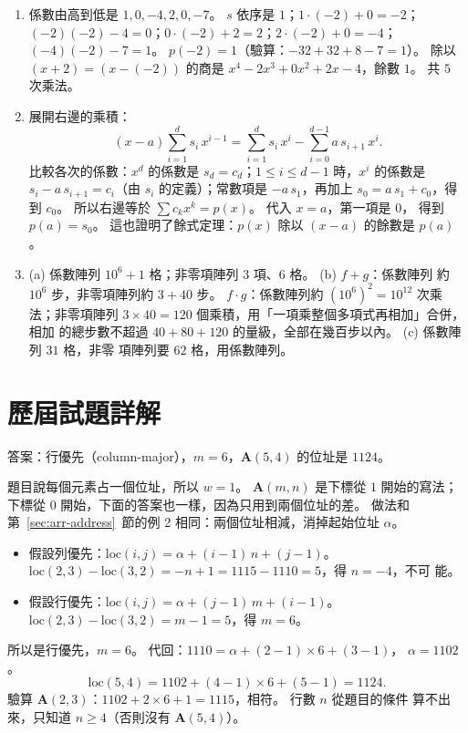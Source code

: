 \begin{enumerate}
\item 係數由高到低是 $1, 0, -4, 2, 0, -7$。 $s$ 依序是 $1$；$1 \cdot (-2) + 0 = -2$；
$(-2)(-2) - 4 = 0$；$0 \cdot (-2) + 2 = 2$；$2 \cdot (-2) + 0 = -4$；$(-4)(-2) - 7 = 1$。
$p(-2) = 1$（驗算：$-32 + 32 + 8 - 7 = 1$）。 除以 $(x + 2) = (x - (-2))$ 的商是
$x^4 - 2x^3 + 0x^2 + 2x - 4$，餘數 $1$。 共 $5$ 次乘法。

\item 展開右邊的乘積：
\[
(x - a)\sum_{i=1}^{d} s_i\,x^{i-1} = \sum_{i=1}^{d} s_i\,x^{i} - \sum_{i=0}^{d-1} a\,s_{i+1}\,x^{i} .
\]
比較各次的係數：$x^d$ 的係數是 $s_d = c_d$；$1 \le i \le d - 1$ 時，$x^i$ 的係數是
$s_i - a\,s_{i+1} = c_i$（由 $s_i$ 的定義）；常數項是 $-a\,s_1$，再加上 $s_0 = a\,s_1
+ c_0$，得到 $c_0$。 所以右邊等於 $\sum c_k x^k = p(x)$。 代入 $x = a$，第一項是 $0$，
得到 $p(a) = s_0$。 這也證明了餘式定理：$p(x)$ 除以 $(x - a)$ 的餘數是 $p(a)$。

\item (a) 係數陣列 $10^6 + 1$ 格；非零項陣列 $3$ 項、$6$ 格。 (b) $f + g$：係數陣列
約 $10^6$ 步，非零項陣列約 $3 + 40$ 步。 $f \cdot g$：係數陣列約 $(10^6)^2 = 10^{12}$
次乘法；非零項陣列 $3 \times 40 = 120$ 個乘積，用「一項乘整個多項式再相加」合併，相加
的總步數不超過 $40 + 80 + 120$ 的量級，全部在幾百步以內。 (c) 係數陣列 $31$ 格，非零
項陣列要 $62$ 格，用係數陣列。
\end{enumerate}

\section*{歷屆試題詳解}

答案：行優先（column-major），$m = 6$，$\mathbf{A}(5,4)$ 的位址是 $1124$。

題目說每個元素占一個位址，所以 $w = 1$。 $\mathbf{A}(m, n)$ 是下標從 $1$ 開始的寫法；
下標從 $0$ 開始，下面的答案也一樣，因為只用到兩個位址的差。 做法和
第~\ref{sec:arr-address}~節的例 2 相同：兩個位址相減，消掉起始位址 $\alpha$。

\begin{itemize}
\item 假設列優先：$\mathrm{loc}(i, j) = \alpha + (i - 1)\,n + (j - 1)$。
$\mathrm{loc}(2,3) - \mathrm{loc}(3,2) = -n + 1 = 1115 - 1110 = 5$，得 $n = -4$，不可
能。
\item 假設行優先：$\mathrm{loc}(i, j) = \alpha + (j - 1)\,m + (i - 1)$。
$\mathrm{loc}(2,3) - \mathrm{loc}(3,2) = m - 1 = 5$，得 $m = 6$。
\end{itemize}
所以是行優先，$m = 6$。 代回：$1110 = \alpha + (2 - 1) \times 6 + (3 - 1)$，
$\alpha = 1102$。
\[
\mathrm{loc}(5,4) = 1102 + (4 - 1) \times 6 + (5 - 1) = 1124 .
\]
驗算 $\mathbf{A}(2,3)$：$1102 + 2 \times 6 + 1 = 1115$，相符。 行數 $n$ 從題目的條件
算不出來，只知道 $n \ge 4$（否則沒有 $\mathbf{A}(5,4)$）。

